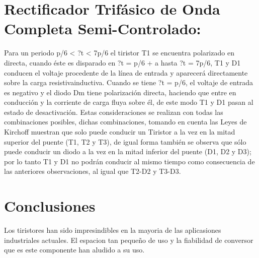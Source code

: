 \documentclass[11pt,a4paper]{article}
\begin{document}
\section{Rectificador Trifásico de Onda Completa Semi-Controlado:}
Para un periodo p/6 < ?t < 7p/6 el tiristor T1 se encuentra polarizado en directa, cuando
éste es disparado en ?t = p/6 + a hasta ?t = 7p/6, T1 y D1 conducen el voltaje
procedente de la línea de entrada y aparecerá directamente sobre la carga resistivainductiva.
Cuando se tiene ?t = p/6, el voltaje de entrada es negativo y el diodo Dm tiene
polarización directa, haciendo que entre en conducción y la corriente de carga fluya sobre
él, de este modo T1 y D1 pasan al estado de desactivación.
Estas consideraciones se realizan con todas las combinaciones posibles, dichas
combinaciones, tomando en cuenta las Leyes de Kirchoff muestran que solo puede
conducir un Tiristor a la vez en la mitad superior del puente (T1, T2 y T3), de igual forma
también se observa que sólo puede conducir un diodo a la vez en la mitad inferior del
puente (D1, D2 y D3); por lo tanto T1 y D1 no podrán conducir al mismo tiempo como
consecuencia de las anteriores observaciones, al igual que T2-D2 y T3-D3.
\section{Conclusiones}
Los tiristores han sido impresindibles en la mayoria de las aplicasiones industriales actuales. El espacion tan pequeño de uso y la fiabilidad de conversor que es este componente han aludido a su uso.
\end{document}
